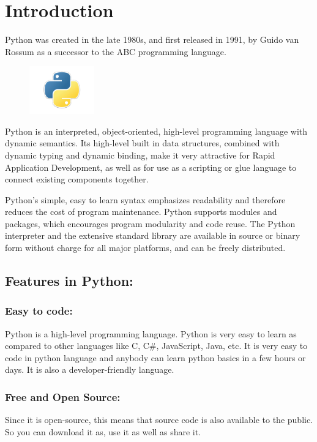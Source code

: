 \documentclass[12pt, a4paper]{report}
\begin{document}
  \section{Introduction}
  Python was created in the late 1980s, and first released in 1991, by Guido van Rossum as a successor to the ABC programming language.
  \begin{figure}
    \includegraphics[width=0.25\textwidth]{introduction}
  \end{figure}
  Python is an interpreted, object-oriented, high-level programming language with dynamic semantics. Its high-level built in data structures, combined with dynamic typing and dynamic binding, make it very attractive for Rapid Application Development, as well as for use as a scripting or glue language to connect existing components together.

  Python's simple, easy to learn syntax emphasizes readability and therefore reduces the cost of program maintenance. Python supports modules and packages, which encourages program modularity and code reuse. The Python interpreter and the extensive standard library are available in source or binary form without charge for all major platforms, and can be freely distributed.
  
  \subsection{Features in Python:}
    \subsubsection{Easy to code:}
    Python is a high-level programming language. Python is very easy to learn as compared to other languages like C, C#, JavaScript, Java, etc. It is very easy to code in python language and anybody can learn python basics in a few hours or days. It is also a developer-friendly language.
    
    \subsubsection{Free and Open Source:}
    Since it is open-source, this means that source code is also available to the public. So you can download it as, use it as well as share it.
    
\end{document}
